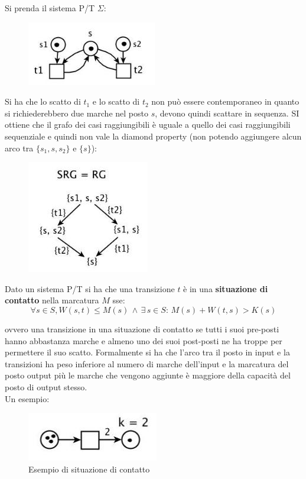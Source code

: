 \documentclass[a4paper,12pt, oneside]{book}
\begin{document}
\begin{esempio}
  Si prenda il sistema P/T $\Sigma$:
  \begin{figure}[H]
    \centering
    \includegraphics[scale = 0.7]{img/pt31.jpg} 
  \end{figure}
  \newpage
  Si ha che lo scatto di $t_1$ e lo scatto di $t_2$ non può essere contemporaneo
  in quanto si richiederebbero due marche nel posto $s$, devono quindi scattare
  in sequenza. SI ottiene che il grafo dei casi raggiungibili è uguale a quello
  dei casi raggiungibili sequenziale e quindi non vale la diamond property (non
  potendo aggiungere alcun arco tra $\{s_1,s,s_2\}$ e $\{s\}$):
  \begin{figure}[H]
    \centering
    \includegraphics[scale = 0.7]{img/pt32.jpg}
  \end{figure}
\end{esempio}
\begin{definizione}
  Dato un sistema P/T si ha che una transizione $t$ è in una \textbf{situazione
    di contatto} nella marcatura $M$ sse:
  \[\forall s\in S, W(s,t)\leq M(s)\,\wedge\,\exists\, s\in S:\,
    M(s)+W(t,s)>K(s)\] 
  
  ovvero una transizione  in una situazione di contatto se tutti i suoi
  pre-posti hanno abbastanza marche e almeno uno dei suoi post-posti ne ha
  troppe per permettere il suo scatto. Formalmente si ha che l'arco tra il posto
  in input e la transizioni ha peso inferiore al numero di marche dell'input e
  la marcatura del posto output più le marche che vengono aggiunte è maggiore
  della capacità del posto di output stesso.\\
  Un esempio:
  \begin{figure}[H]
    \centering
    \includegraphics[scale = 0.65]{img/pt33.jpg}
    \caption{Esempio di situazione di contatto}
  \end{figure}
\end{definizione}
\end{document}
